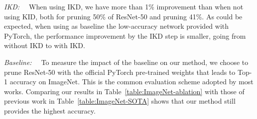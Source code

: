 \documentclass{article}
\begin{document}
\textit{IKD:\ \ } 
When using IKD, we have more than 1\% improvement than when not using KID, both for pruning 50\% of ResNet-50 and pruning 41\%.
As could be expected, when using as baseline the low-accuracy network provided with PyTorch, the performance improvement by the IKD step is smaller, going from   without IKD to  with IKD.


\textit{Baseline:\ \ }
To measure the impact of the baseline on our method, we choose to prune ResNet-50 with the official PyTorch \cite{PyTorch} pre-trained weights that leads to  Top-1 accuracy on ImageNet.
This is the common evaluation scheme adopted by most works. 
Comparing our results in Table~\ref{table:ImageNet-ablation} with those of previous work in Table~\ref{table:ImageNet-SOTA} shows that our method still provides the highest accuracy.
\end{document}
